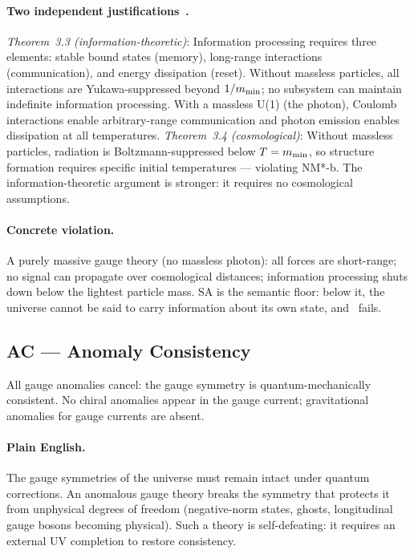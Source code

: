 \documentclass[11pt,openany]{book}
\theoremstyle{remark}
\newcommand{\PSC}{\text{PSC}}
\begin{document}
\paragraph{Two independent justifications~\cite{SpivackNEMS05}.}
\textit{Theorem~3.3 (information-theoretic)}: Information processing requires three
elements: stable bound states (memory), long-range interactions (communication), and
energy dissipation (reset). Without massless particles, all interactions are
Yukawa-suppressed beyond $1/m_{\rm min}$; no subsystem can maintain indefinite
information processing. With a massless U(1) (the photon), Coulomb interactions
enable arbitrary-range communication and photon emission enables dissipation at all
temperatures. \textit{Theorem~3.4 (cosmological)}: Without massless particles,
radiation is Boltzmann-suppressed below $T = m_{\rm min}$, so structure formation
requires specific initial temperatures --- violating NM*-b. The information-theoretic
argument is stronger: it requires no cosmological assumptions.

\paragraph{Concrete violation.}
A purely massive gauge theory (no massless photon): all forces are short-range; no
signal can propagate over cosmological distances; information processing shuts down
below the lightest particle mass. SA is the semantic floor: below it, the universe
cannot be said to carry information about its own state, and \PSC\ fails.

\subsection*{AC --- Anomaly Consistency}

\begin{tcolorbox}[colback=green!5,colframe=green!50!black,
  title={Definition: AC --- Anomaly Consistency}]
All gauge anomalies cancel: the gauge symmetry is quantum-mechanically consistent.
No chiral anomalies appear in the gauge current; gravitational anomalies for gauge
currents are absent.
\end{tcolorbox}

\paragraph{Plain English.}
The gauge symmetries of the universe must remain intact under quantum corrections.
An anomalous gauge theory breaks the symmetry that protects it from unphysical degrees
of freedom (negative-norm states, ghosts, longitudinal gauge bosons becoming physical).
Such a theory is self-defeating: it requires an external UV completion to restore
consistency.
\end{document}
